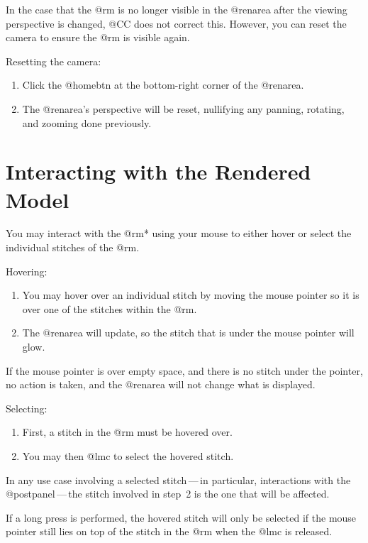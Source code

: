 \documentclass[main.tex]{subfiles}
\begin{document}
In the case that the @rm is no longer visible in the @renarea after the viewing perspective is changed,
@CC does not correct this. However, you can reset the camera to ensure the @rm is visible again.

Resetting the camera:
\begin{enumerate}
\item Click the @homebtn at the bottom-right corner of the @renarea.
\item The @renarea's perspective will be reset, nullifying any panning, rotating, and zooming done previously.
\end{enumerate}

\section{Interacting with the Rendered Model}\label{sec:interactrm}

You may interact with the @rm* using your mouse to either hover or select the individual stitches of the @rm.

Hovering:
\begin{enumerate}
\item You may hover over an individual stitch by moving the mouse pointer so it is over one of the stitches within the @rm.
\item The @renarea will update, so the stitch that is under the mouse pointer will glow.
\end{enumerate}

If the mouse pointer is over empty space, and there is no stitch under the pointer, no action is taken, and the @renarea will not change what is displayed.

Selecting:
\begin{enumerate}
\item First, a stitch in the @rm must be hovered over. 
\item You may then @lmc to select the hovered stitch. 
\end{enumerate}

In any use case involving a selected stitch\,---\,in particular, interactions with the @postpanel\,---\,the stitch involved in step~2 is the one that will be affected.

If a long press is performed, the hovered stitch will only be selected if the mouse pointer still lies on top of the stitch in the @rm when the @lmc is released.
\end{document}
